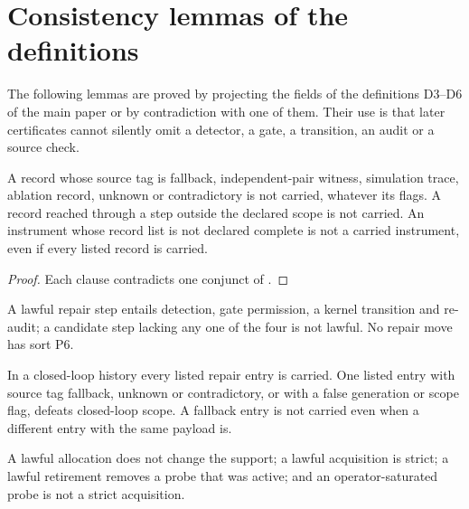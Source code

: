 \section{Consistency lemmas of the definitions}
\label{supp:lemmas}

The following lemmas are proved by projecting the fields of the definitions D3--D6 of the main paper
or by contradiction with one of them. Their use is that later certificates cannot silently omit a
detector, a gate, a transition, an audit or a source check.

\begin{lemma}\label{lem:d3}
A record whose source tag is fallback, independent-pair witness, simulation trace, ablation record,
unknown or contradictory is not carried, whatever its flags. A record reached through a step outside
the declared scope is not carried. An instrument whose record list is not declared complete is not a
carried instrument, even if every listed record is carried.
\end{lemma}

\begin{proof}
Each clause contradicts one conjunct of .
\end{proof}

\begin{lemma}\label{lem:d4}
A lawful repair step entails detection, gate permission, a kernel transition and re-audit; a
candidate step lacking any one of the four is not lawful. No repair move has sort P6.
\end{lemma}

\begin{lemma}\label{lem:d5}
In a closed-loop history every listed repair entry is carried. One listed entry with source tag
fallback, unknown or contradictory, or with a false generation or scope flag, defeats closed-loop
scope. A fallback entry is not carried even when a different entry with the same payload is.
\end{lemma}

\begin{lemma}\label{lem:d6}
A lawful allocation does not change the support; a lawful acquisition is strict; a lawful retirement
removes a probe that was active; and an operator-saturated probe is not a strict acquisition.
\end{lemma}
